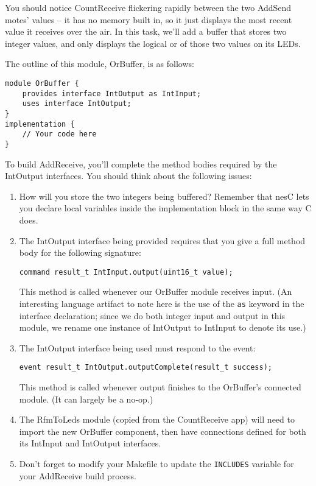\documentclass{article}
\begin{document}
You should notice CountReceive flickering rapidly between the two AddSend motes' values -- it has no memory built in, so it just displays the most recent value it receives over the air. In this task, we'll add a buffer that stores two integer values, and only displays the logical or of those two values on its LEDs.

The outline of this module, OrBuffer, is as follows:

\begin{verbatim}
module OrBuffer {
    provides interface IntOutput as IntInput;
    uses interface IntOutput;
}
implementation {
    // Your code here
}
\end{verbatim}

To build AddReceive, you'll complete the method bodies required by the IntOutput interfaces. You should think about the following issues:

\begin{enumerate}
\item How will you store the two integers being buffered? Remember that nesC lets you declare local variables inside the implementation block in the same way C does.
\item The IntOutput interface being provided requires that you give a full method body for the following signature:

\begin{verbatim}
command result_t IntInput.output(uint16_t value);
\end{verbatim}

This method is called whenever our OrBuffer module receives input. (An interesting language artifact to note here is the use of the \verb!as! keyword in the interface declaration; since we do both integer input and output in this module, we rename one instance of IntOutput to IntInput to denote its use.)

\item The IntOutput interface being used must respond to the event:

\begin{verbatim}
event result_t IntOutput.outputComplete(result_t success);
\end{verbatim}

This method is called whenever output finishes to the OrBuffer's connected module. (It can largely be a no-op.)

\item The RfmToLeds module (copied from the CountReceive app) will need to import the new OrBuffer component, then have connections defined for both its IntInput and IntOutput interfaces.

\item Don't forget to modify your Makefile to update the \verb!INCLUDES! variable for your AddReceive build process.
\end{enumerate}
\end{document}
